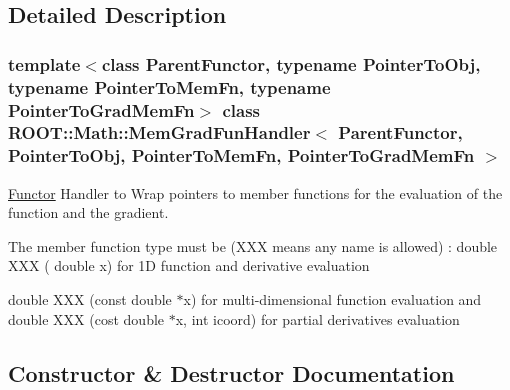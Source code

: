 \subsection{Detailed Description}
\subsubsection*{template$<$class Parent\+Functor, typename Pointer\+To\+Obj, typename Pointer\+To\+Mem\+Fn, typename Pointer\+To\+Grad\+Mem\+Fn$>$\newline
class R\+O\+O\+T\+::\+Math\+::\+Mem\+Grad\+Fun\+Handler$<$ Parent\+Functor, Pointer\+To\+Obj, Pointer\+To\+Mem\+Fn, Pointer\+To\+Grad\+Mem\+Fn $>$}

\mbox{\hyperlink{classROOT_1_1Math_1_1Functor}{Functor}} Handler to Wrap pointers to member functions for the evaluation of the function and the gradient.

The member function type must be (X\+XX means any name is allowed) \+: double X\+XX ( double x) for 1D function and derivative evaluation

double X\+XX (const double $\ast$x) for multi-\/dimensional function evaluation and double X\+XX (cost double $\ast$x, int icoord) for partial derivatives evaluation 

\subsection{Constructor \& Destructor Documentation}
\mbox{\label{classROOT_1_1Math_1_1MemGradFunHandler_afb840379796fb7d05d885bc3152a3175}} 
